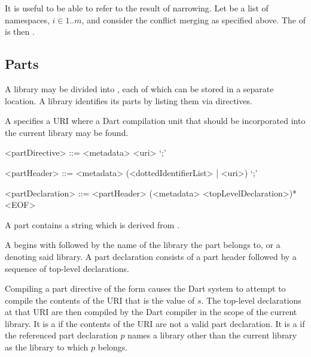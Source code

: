 \documentclass[makeidx]{article}
\begin{document}

\LMHash{}%
It is useful to be able to refer to the result of narrowing.
Let  be a list of namespaces, $i \in 1 .. m$,
and consider the conflict merging as specified above.
The
of  is then .


\subsection{Parts}

\LMHash{}%
A library may be divided into ,
each of which can be stored in a separate location.
A library identifies its parts by listing them via \PART{} directives.

\LMHash{}%
A  specifies a URI where
a Dart compilation unit that should be incorporated into the current library
may be found.

\begin{grammar}
<partDirective> ::= <metadata> \PART{} <uri> `;'

<partHeader> ::= <metadata> \PART{} \OF{} (<dottedIdentifierList> | <uri>) `;'

<partDeclaration> ::=
  <partHeader> (<metadata> <topLevelDeclaration>)* <EOF>
\end{grammar}

\LMHash{}%
A part contains a string which is derived from .


\LMHash{}%
A  begins with \PART{} \OF{} followed by
the name of the library the part belongs to,
or a  denoting said library.
A part declaration consists of a part header followed by
a sequence of top-level declarations.

\LMHash{}%
Compiling a part directive of the form 
causes the Dart system to attempt to compile the contents of
the URI that is the value of $s$.
The top-level declarations at that URI are then compiled by the Dart compiler
in the scope of the current library.
It is a  if the contents of the URI are not
a valid part declaration.
It is a  if the referenced part declaration $p$ names
a library other than the current library as the library to which $p$ belongs.
\end{document}
